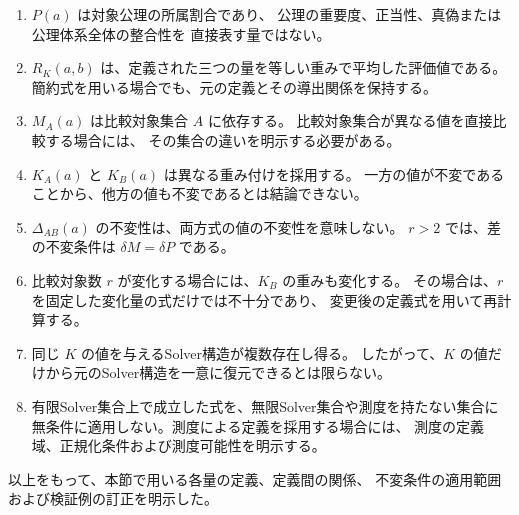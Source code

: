 \documentclass[a4paper,11pt]{ltjsarticle}
\begin{document}
\begin{enumerate}
\item $P(a)$ は対象公理の所属割合であり、
      公理の重要度、正当性、真偽または公理体系全体の整合性を
      直接表す量ではない。

\item $R_K(a,b)$ は、定義された三つの量を等しい重みで平均した評価値である。
      簡約式を用いる場合でも、元の定義とその導出関係を保持する。

\item $M_A(a)$ は比較対象集合 $A$ に依存する。
      比較対象集合が異なる値を直接比較する場合には、
      その集合の違いを明示する必要がある。

\item $K_A(a)$ と $K_B(a)$ は異なる重み付けを採用する。
      一方の値が不変であることから、他方の値も不変であるとは結論できない。

\item $\Delta_{AB}(a)$ の不変性は、両方式の値の不変性を意味しない。
      $r>2$ では、差の不変条件は $\delta M=\delta P$ である。

\item 比較対象数 $r$ が変化する場合には、$K_B$ の重みも変化する。
      その場合は、$r$ を固定した変化量の式だけでは不十分であり、
      変更後の定義式を用いて再計算する。

\item 同じ $K$ の値を与えるSolver構造が複数存在し得る。
      したがって、$K$ の値だけから元のSolver構造を一意に復元できるとは限らない。

\item 有限Solver集合上で成立した式を、無限Solver集合や測度を持たない集合に
      無条件に適用しない。測度による定義を採用する場合には、
      測度の定義域、正規化条件および測度可能性を明示する。
\end{enumerate}

以上をもって、本節で用いる各量の定義、定義間の関係、
不変条件の適用範囲および検証例の訂正を明示した。

\end{document}
